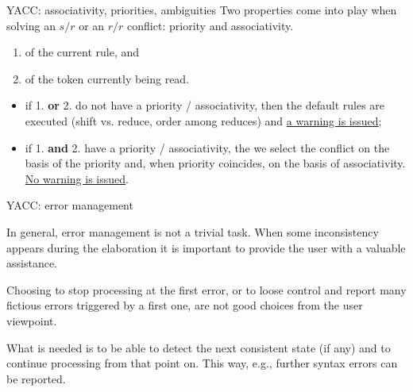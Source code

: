 \begin{frame}[fragile]{YACC: associativity, priorities, ambiguities}
Two properties come into play when solving an
$s/r$ or an $r/r$ conflict: priority and associativity.


\vspace{20pt}

\begin{enumerate}
\item of the current rule, and 
\item of the token currently being read.
\end{enumerate}


\vspace{20pt}

\begin{itemize}
\item if 1. {\bf or} 2. do not have a priority / associativity,
then the default rules are executed (shift vs. reduce, order
among reduces) and \underline{a warning is issued};
\item if 1. {\bf and} 2. have a priority / associativity,
the we select the conflict on the basis of the priority
and, when priority coincides, on the basis of associativity.
\underline{No warning is issued}.
\end{itemize}




\end{frame}
\begin{frame}[fragile]{YACC: error management}

In general, error management is not a trivial task.
When some inconsistency appears during the elaboration
it is important to provide the user with a valuable
assistance.


\vspace{20pt}

Choosing to stop processing at the first
error, or to loose control and report many fictious errors
triggered by a first one, are not good choices from the
user viewpoint.


\vspace{20pt}

What is needed is to be able to detect the next
consistent state (if any) and to continue processing from that
point on. This way, e.g., further syntax errors can be reported.



\end{frame}
